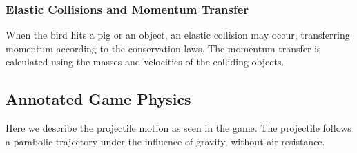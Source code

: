 \documentclass[12pt]{article}
\begin{document}
\subsubsection*{Elastic Collisions and Momentum Transfer}
When the bird hits a pig or an object, an elastic collision may occur, transferring momentum according to the conservation laws. The momentum transfer is calculated using the masses and velocities of the colliding objects.

\subsection{Annotated Game Physics}

Here we describe the projectile motion as seen in the game. The projectile follows a parabolic trajectory under the influence of gravity, without air resistance.
\end{document}
